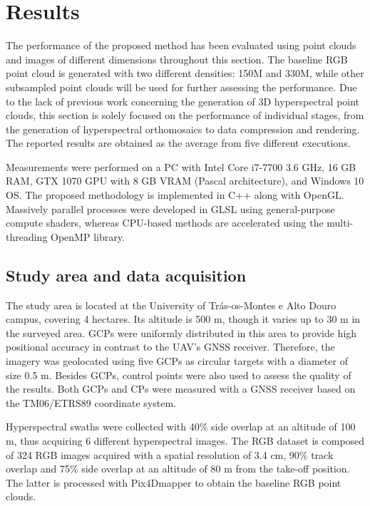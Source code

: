 \section{Results}

The performance of the proposed method has been evaluated using point clouds and images of different dimensions throughout this section. The baseline RGB point cloud is generated with two different densities: 150M and 330M, while other subsampled point clouds will be used for further assessing the performance. Due to the lack of previous work concerning the generation of 3D hyperspectral point clouds, this section is solely focused on the performance of individual stages, from the generation of hyperspectral orthomosaics to data compression and rendering. The reported results are obtained as the average from five different executions.

Measurements were performed on a PC with Intel Core i7-7700 3.6 GHz, 16 GB RAM, GTX 1070 GPU with 8 GB VRAM (Pascal architecture), and Windows 10 OS. The proposed methodology is implemented in C++ along with OpenGL. Massively parallel processes were developed in GLSL using general-purpose compute shaders, whereas CPU-based methods are accelerated using the multi-threading OpenMP library.

\subsection{Study area and data acquisition}

The study area is located at the University of Trás-os-Montes e Alto Douro campus, covering 4 hectares. Its altitude is 500 \si{\meter}, though it varies up to 30 \si{\meter} in the surveyed area. GCPs were uniformly distributed in this area to provide high positional accuracy in contrast to the UAV’s GNSS receiver. Therefore, the imagery was geolocated using five GCPs as circular targets with a diameter of size 0.5 \si{\meter}. Besides GCPs, control points were also used to assess the quality of the results. Both GCPs and CPs were measured with a GNSS receiver based on the TM06/ETRS89 coordinate system.

Hyperspectral swaths were collected with 40\% side overlap at an altitude of 100 \si{\meter}, thus acquiring 6 different hyperspectral images. The RGB dataset is composed of 324 RGB images acquired with a spatial resolution of 3.4 \si{\centi\meter}, 90\% track overlap and 75\% side overlap at an altitude of 80 \si{\meter} from the take-off position. The latter is processed with Pix4Dmapper to obtain the baseline RGB point clouds. 

